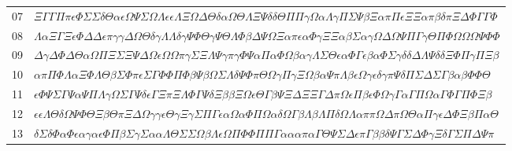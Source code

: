 \documentclass[11pt,a4paper]{article}
\begin{document}
\begin{boitecertificat}
{\begin{tabular}{@{}r l@{}}
07 & \textcolor{spectralargent}{$\Xi\Gamma\Gamma\Pi\pi\epsilon\Phi\Sigma\Sigma\delta\Theta\alpha\epsilon\Omega\Psi\Sigma\Omega\Lambda\epsilon\epsilon\Lambda\Xi\Omega\Delta\Theta\delta\alpha\Omega\Theta\Lambda\Xi\Psi\delta\delta\Theta\Pi\Pi\gamma\Omega\alpha\Lambda\gamma\Pi\Sigma\Psi\beta\Xi\alpha\pi\Pi\epsilon\Xi\Xi\alpha\pi\beta\delta\pi\Xi\Delta\Phi\Gamma\Gamma\Phi$} \\
08 & \textcolor{spectralargent}{$\Lambda\alpha\Xi\Gamma\Xi\epsilon\Phi\Delta\Delta\epsilon\pi\gamma\gamma\Delta\Omega\Theta\delta\gamma\Lambda\Lambda\delta\gamma\Psi\Phi\Theta\gamma\Psi\Theta\Lambda\Phi\beta\Delta\Psi\Omega\Xi\alpha\pi\epsilon\alpha\Phi\gamma\Xi\Xi\alpha\beta\Sigma\alpha\gamma\Omega\Delta\Omega\Psi\Pi\Gamma\gamma\Theta\Pi\Phi\Omega\Omega\Omega\Psi\Phi\Phi$} \\
09 & \textcolor{spectralargent}{$\Delta\gamma\Delta\Phi\Delta\Theta\alpha\Omega\Pi\Xi\Sigma\Xi\Psi\Delta\Omega\epsilon\Omega\Omega\pi\gamma\Sigma\Xi\Lambda\Psi\gamma\pi\gamma\Phi\Psi\alpha\Pi\alpha\Phi\Omega\beta\alpha\gamma\Lambda\Sigma\Theta\epsilon\alpha\Phi\Gamma\epsilon\beta\alpha\Phi\Sigma\gamma\delta\delta\Delta\Lambda\Psi\delta\delta\Xi\Phi\Pi\gamma\Pi\Xi\beta$} \\
10 & \textcolor{spectralargent}{$\alpha\pi\Pi\Phi\Lambda\alpha\Xi\Phi\Lambda\Theta\beta\Sigma\Phi\pi\epsilon\Sigma\Gamma\Phi\Phi\Pi\Phi\beta\Psi\beta\Omega\Sigma\Lambda\delta\Psi\Phi\pi\Theta\Omega\gamma\Pi\gamma\Xi\Omega\beta\alpha\Psi\pi\Lambda\beta\epsilon\Omega\gamma\epsilon\delta\gamma\pi\Psi\delta\Pi\Sigma\Delta\Sigma\Gamma\beta\alpha\beta\Phi\Phi\Theta$} \\
11 & \textcolor{spectralargent}{$\epsilon\Phi\Psi\Sigma\Gamma\Psi\alpha\Psi\Pi\Lambda\gamma\Omega\Sigma\Gamma\Psi\delta\epsilon\Gamma\Xi\pi\Xi\Lambda\Phi\Gamma\Psi\delta\Xi\beta\beta\Xi\Omega\epsilon\Theta\Gamma\beta\Psi\Xi\Delta\Xi\Xi\Gamma\Delta\pi\Omega\epsilon\Pi\beta\epsilon\Phi\Omega\gamma\Gamma\alpha\Gamma\Pi\Omega\alpha\Gamma\Phi\Gamma\Pi\Phi\Xi\beta$} \\
12 & \textcolor{spectralargent}{$\epsilon\epsilon\Lambda\Theta\delta\Omega\Psi\Phi\Theta\Xi\beta\Theta\pi\Xi\Delta\Omega\gamma\gamma\epsilon\Theta\gamma\Xi\gamma\Sigma\Pi\Gamma\epsilon\alpha\Omega\alpha\Phi\Pi\Omega\alpha\delta\Omega\Gamma\beta\Lambda\beta\Lambda\Pi\delta\Omega\Lambda\alpha\pi\pi\Omega\Delta\pi\Omega\Theta\alpha\Pi\gamma\epsilon\Delta\Phi\Xi\beta\Pi\alpha\Theta$} \\
13 & \textcolor{spectralargent}{$\delta\Sigma\delta\Phi\alpha\Phi\epsilon\alpha\gamma\alpha\epsilon\Phi\Pi\beta\Sigma\gamma\Sigma\alpha\alpha\Lambda\Theta\Sigma\Sigma\Omega\beta\Lambda\epsilon\Omega\Pi\Phi\Phi\Pi\Pi\Gamma\alpha\alpha\alpha\pi\alpha\Gamma\Theta\Psi\Sigma\Delta\epsilon\pi\Gamma\beta\beta\delta\Psi\Gamma\Sigma\Delta\Phi\gamma\Xi\delta\Gamma\Sigma\Pi\Delta\Psi\pi$} \\

\end{tabular}}
\end{boitecertificat}
\end{document}
